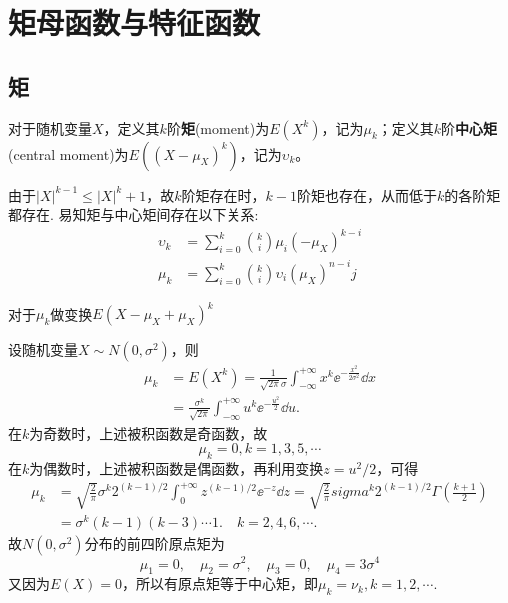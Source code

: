 \section{矩母函数与特征函数}

\subsection{矩}

\begin{definition}
    对于随机变量$X$，定义其$k$阶\textbf{矩}(moment)为$E(X^k)$，记为$\mu_k$；定义其$k$阶\textbf{中心矩}(central moment)为$E((X-\mu_X)^k)$，记为$\upsilon_k$。
\end{definition}
由于$|X|^{k-1}\le |X|^k+1$，故$k$阶矩存在时，$k-1$阶矩也存在，从而低于$k$的各阶矩都存在.
易知矩与中心矩间存在以下关系:
\begin{align*}
    \upsilon_k & =\sum_{i=0}^k \binom{k}{i} \mu_i(-\mu_X)^{k-i}      \\
    \mu_k      & =\sum_{i=0}^k \binom{k}{i} \upsilon_i(\mu_X)^{n-i}j
\end{align*}
\begin{note}
    对于$\mu_k$做变换$E(X-\mu_X+\mu_X)^k$
\end{note}

\begin{example}
    设随机变量$X\sim N(0,\sigma^2)$，则
    \begin{align*}
        \mu_k & = E(X^k) = \frac1{\sqrt{2\pi}\sigma}\int_{-\infty}^{+\infty} x^k\ee^{-\frac{x^2}{2\sigma^2}} \dd x \\
              & = \frac{\sigma^k}{\sqrt{2\pi}} \int_{-\infty}^{+\infty}u^k\ee^{-\frac{u^2}2}\dd u.
    \end{align*}
    在$k$为奇数时，上述被积函数是奇函数，故
    \[ \mu_k = 0, k=1,3,5,\cdots \]
    在$k$为偶数时，上述被积函数是偶函数，再利用变换$z=u^2/2$，可得
    \begin{align*}
        \mu_k & = \sqrt{\frac2\pi}\sigma^k2^{(k-1)/2} \int_0^{+\infty}z^{(k-1)/2}\ee^{-z} \dd z = \sqrt{\frac2\pi}sigma^k2^{(k-1)/2} \Gamma\left( \frac{k+1}2 \right) \\
              & = \sigma^k(k-1)(k-3)\cdots1.\quad k=2,4,6,\cdots.
    \end{align*}
    故$N(0,\sigma^2)$分布的前四阶原点矩为
    \[ \mu_1 = 0,\quad \mu_2 = \sigma^2,\quad \mu_3 = 0,\quad \mu_4 = 3\sigma^4 \]
    又因为$E(X)=0$，所以有原点矩等于中心矩，即$\mu_k=\nu_k,k=1,2,\cdots$.
\end{example}

